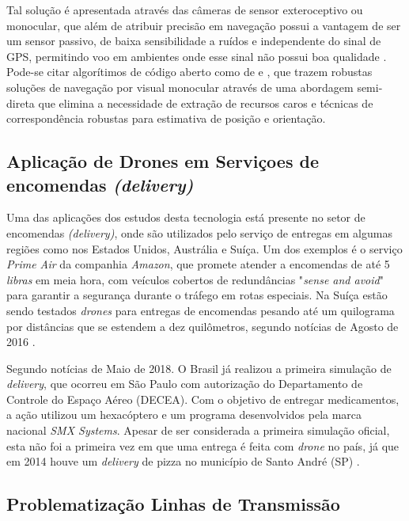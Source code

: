 Tal solução é apresentada através das câmeras de sensor exteroceptivo ou monocular, que além de atribuir precisão em navegação possui a vantagem de ser um sensor passivo, de baixa sensibilidade a ruídos e independente do sinal de GPS, permitindo voo em ambientes onde esse sinal não possui boa qualidade \cite{GUO2014}. Pode-se citar algorítimos de código aberto como de \citet{Forster2014} e \citet{Raul2016}, que trazem robustas soluções de navegação por visual monocular através de uma abordagem semi-direta que elimina a necessidade de extração de recursos caros e técnicas de correspondência robustas para estimativa de posição e orientação.


\subsection{Aplicação de Drones em Serviçoes de encomendas \textit{(delivery)}}

Uma das aplicações dos estudos desta tecnologia está presente no setor de encomendas \textit{(delivery)}, onde são utilizados pelo serviço de entregas em algumas regiões como nos Estados Unidos, Austrália e Suíça. Um dos exemplos é o serviço \textit{Prime Air} da companhia \textit{Amazon}, que promete atender a encomendas de até 5 \textit{libras} em meia hora, com veículos cobertos de redundâncias "\textit{sense and avoid}" para garantir a segurança durante o tráfego em rotas especiais. Na Suíça estão sendo testados \textit{drones} para entregas de encomendas pesando até um quilograma por distâncias que se estendem a dez quilômetros, segundo notícias de Agosto de 2016 \cite{Vidal2016}.

Segundo notícias de Maio de 2018. O Brasil já realizou a primeira simulação de \textit{delivery}, que ocorreu em São Paulo com autorização do Departamento de Controle do Espaço Aéreo (DECEA). Com o objetivo de entregar medicamentos, a ação utilizou um hexacóptero e um programa desenvolvidos pela marca nacional \textit{SMX Systems}. Apesar de ser considerada a primeira simulação oficial, esta não foi a primeira vez em que uma entrega é feita com \textit{drone} no país, já que em 2014 houve um \textit{delivery} de pizza no município de Santo André (SP) \cite{Techtudo2018}.


\subsection{Problematização Linhas de Transmissão}

